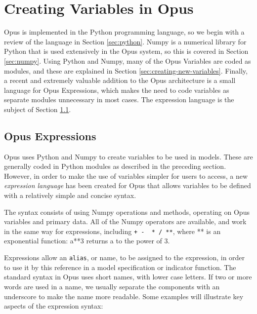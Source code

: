 \chapter{Creating Variables in Opus}
\label{chap:creating-variables}

Opus is implemented in the Python programming language, so we begin
with a review of the language in Section \ref{sec:python}. Numpy is a numerical library for Python that is used extensively in the
Opus system, so this is covered in Section \ref{sec:numpy}. Using
Python and Numpy, many of the Opus Variables are coded as modules, and
these are explained in Section \ref{sec:creating-new-variables}.  Finally, a recent
and extremely valuable addition to the Opus architecture is a small
language for Opus Expressions, which makes the need to code variables
as separate modules unnecessary in most cases.  The expression language
is the subject of Section \ref{sec:expressions}.



\section{Opus Expressions}
\label{sec:expressions}

Opus uses Python and Numpy to create variables to be used in models.  These are generally coded in Python modules as
described in the preceding section.  However, in order to make the use of variables simpler for users to access, a new
\emph{expression language} has been created for Opus
that allows variables to be defined with a relatively simple and concise syntax.  

The syntax consists of using Numpy operations and methods, operating on Opus variables and primary data.  All of the Numpy operators are available, and work in the same way for expressions, including \verb#+ -  * / **#, where ** is an exponential function: a**3 returns a to the power of 3.

Expressions allow an \verb#alias#, or name, to be assigned to the expression, in order to use it by this reference in a model specification or indicator function.  The standard syntax in Opus uses short names, with lower case letters.  If two or more words are used in a name, we usually separate the components with an underscore to make the name more readable.  Some examples will illustrate key aspects of the expression syntax:

